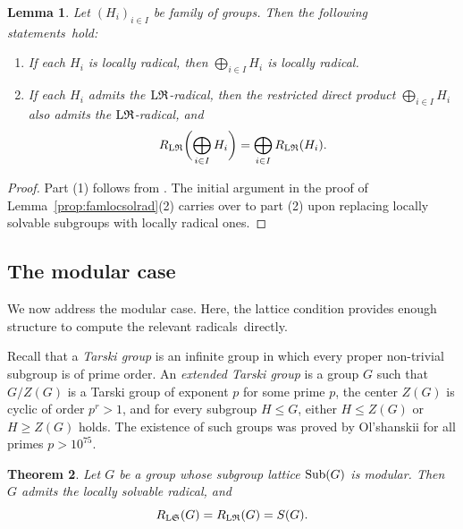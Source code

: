 \documentclass[11pt, reqno]{amsart}
\numberwithin{equation}{section}
\newtheorem{theorem}{Theorem}[section]
\newtheorem{lemma}[theorem]{Lemma}
\theoremstyle{definition}
\numberwithin{equation}{section}
\begin{document}
\begin{lemma} \label{proplocradformula}
    Let $(H_i)_{i\in I}$ be family of groups. Then the following statements~hold:
  \begin{enumerate}[label = \textup{(\arabic*)}]
    \item If each $H_i$ is locally radical, then  $\bigoplus_{i \in I} H_i$ is locally radical.
    \item If each $H_i$ admits the $\textup{L}\mathfrak{R}$-radical, then the restricted direct product $\bigoplus_{i \in I}H_i$ also admits the $\textup{L}\mathfrak{R}$-radical, and
        $$ R_{\textup{L}\mathfrak{R}}\biggl(\bigoplus_{i \in I}H_i\biggr) = \bigoplus_{i\in I} R_{\textup{L}\mathfrak{R}}(H_i). $$
  \end{enumerate}
\end{lemma}

\begin{proof}
Part (1) follows from \cite[Proposition 1.2.15(iii)]{Dixon17}. The initial argument in the proof of Lemma~\ref{prop:famlocsolrad}(2) carries over to part (2) upon replacing locally solvable subgroups with locally radical ones.
\end{proof}

\subsection{The modular case} \hfill

\medskip

We now address the modular case. Here, the lattice condition provides enough structure to compute the relevant radicals~directly.
   
Recall that a \emph{Tarski group} is an infinite group in which every proper non-trivial subgroup is of prime order. An \emph{extended Tarski group} is a group $G$ such that $G/Z(G)$ is a Tarski group of exponent $p$ for some prime $p$, the center $Z(G)$ is cyclic of order $p^r >1$, and for every subgroup $H \leq G$, either $H \leq Z(G)$ or $H \geq Z(G)$ holds. The existence of such groups was proved by Ol'shanskii \cite{Olshanskii80,Olshanskii82,Olshanskii91} for all primes $p>10^{75}$.

\begin{theorem}\label{theo:modularlatticelocalsolrad}
    Let $G$ be a group whose subgroup lattice $\textup{Sub}(G)$ is modular. Then $G$ admits the locally solvable radical, and $$R_{\textup{L}\mathfrak{S}}(G) = R_{\textup{L}\mathfrak{R}}(G) = S(G).$$ 
\end{theorem}
\end{document}
